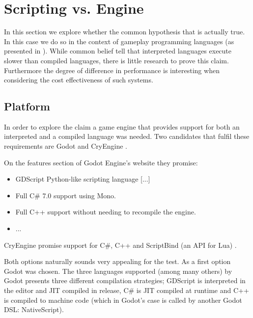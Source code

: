 \section{Scripting vs. Engine}
In this section we explore whether the common hypothesis that \textit{}\cite{IBM:Knowledgebase} is actually true. In this case we do so in the context of gameplay programming languages (as presented in ). While common belief tell that interpreted languages execute slower than compiled languages, there is little research to prove this claim. Furthermore the degree of difference in performance is interesting when considering the cost effectiveness of such systems.

\subsection{Platform}
In order to explore the claim a game engine that provides support for both an interpreted and a compiled language was needed. Two candidates that fulfil these requirements are Godot and CryEngine \cite{cryengine:home}.

On the features section of Godot Engine's website they promise:
\begin{itemize}
    \item GDScript Python-like scripting language [...]
    \item Full C\# 7.0 support using Mono.
    \item Full C++ support without needing to recompile the engine.
    \item ...
\end{itemize}
CryEngine promise support for C\#, C++ and ScriptBind (an \ac{API} for Lua) \cite{cryengine:languages}.

Both options naturally sounds very appealing for the test. As a first option Godot was chosen. The three languages supported (among many others) by Godot presents three different compilation strategies; GDScript is interpreted in the editor and \ac{JIT} compiled in release\cite{locurcio:gdscript}, C\# is \ac{JIT} compiled at runtime and C++ is compiled to machine code (which in Godot's case is called by another Godot \ac{DSL}: NativeScript). 

